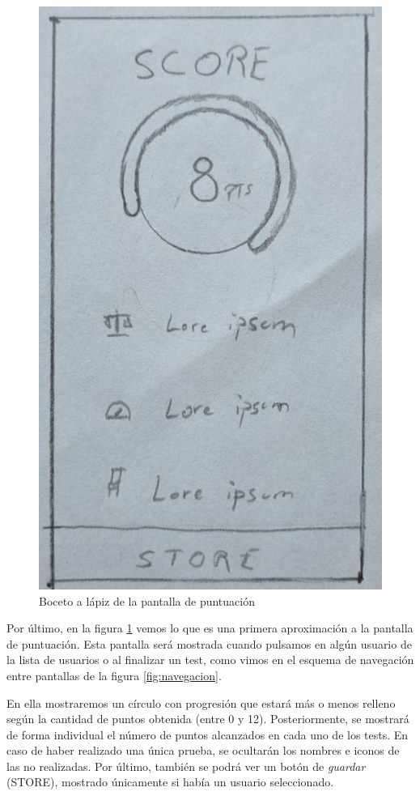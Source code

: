 \begin{figure}[H]
	\centering
	\includegraphics[scale=0.55]{imagenes/boceto_score.jpg}
	\caption{Boceto a lápiz de la pantalla de puntuación\label{fig:boceto_puntuacion}}
\end{figure}

Por último, en la figura \ref{fig:boceto_puntuacion} vemos lo que es una primera aproximación a la pantalla de puntuación. Esta pantalla será mostrada cuando pulsamos en algún usuario de la lista de usuarios o al finalizar un test, como vimos en el esquema de navegación entre pantallas de la figura \ref{fig:navegacion}. 

En ella mostraremos un círculo con progresión que estará más o menos relleno según la cantidad de puntos obtenida (entre 0 y 12). Posteriormente, se mostrará de forma individual el número de puntos alcanzados en cada uno de los tests. En caso de haber realizado una única prueba, se ocultarán los nombres e iconos de las no realizadas. Por último, también se podrá ver un botón de \textit{guardar} (STORE), mostrado únicamente si había un usuario seleccionado.

